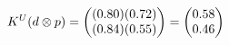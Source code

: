 \documentclass[preview]{standalone}
\begin{document}
\begin{align*}
\special{dvisvgm:raw <g id='unique000'>}K^U(d \otimes p) = \begin{pmatrix} (0.80)(0.72) \\ (0.84)(0.55) \end{pmatrix} = \begin{pmatrix} 0.58 \\ 0.46 \end{pmatrix}\special{dvisvgm:raw </g>}
\end{align*}
\end{document}
